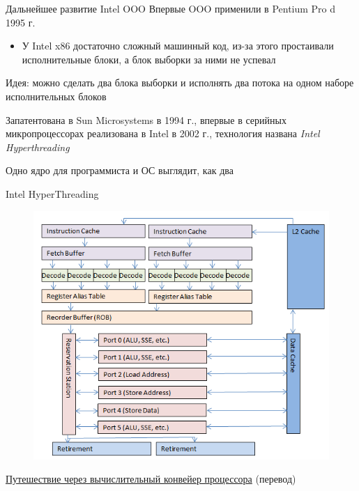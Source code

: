 \documentclass[xetex,aspectratio=43]{beamer}
\begin{document}
\begin{frame}{Дальнейшее развитие Intel OOO}
        Впервые OOO применили в Pentium Pro d 1995 г.

        \begin{itemize}
            \tightlist
            \item
            У Intel x86 достаточно сложный машинный код, из-за этого простаивали
            исполнительные блоки, а блок выборки за ними не успевал
        \end{itemize}

        \pause

        Идея: можно сделать два блока выборки и исполнять два потока на одном
        наборе исполнительных блоков

        Запатентована в Sun Microsystems в 1994 г., впервые в серийных
        микропроцессорах реализована в Intel в 2002 г., технология названа \emph{Intel
        Hyperthreading}

        Одно ядро для программиста и ОС выглядит, как два
\end{frame}

\begin{frame}{Intel HyperThreading}
    \begin{figure}
        \includegraphics[height=0.8\textheight]{img/11.Intel_HT.png}
    \end{figure}

    \href{https://habr.com/ru/post/182002/}{Путешествие через вычислительный конвейер процессора} (перевод)
\end{frame}
\end{document}
